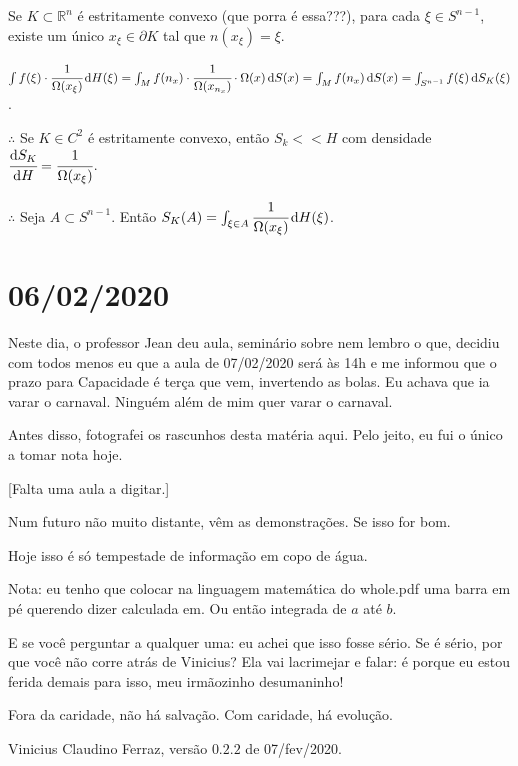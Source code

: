 \documentclass[12pt]{article}
\begin{document}
Se $K \subset \mathbb{R}^n$ \'e estritamente convexo (que porra \'e essa???), para cada $\xi \in S^{n - 1}$, existe um \'unico $x_\xi\in \partial K$ tal que $n(x_\xi) = \xi$.

$\int f(\xi) \cdot \cfrac{1}{\Omega(x_\xi)} \,\mathrm{d}H(\xi) = \int_M f(n_x) \cdot\cfrac{1}{\Omega(x_{n_x})}\cdot \Omega(x)\,\mathrm{d}S(x) = \int_M f(n_x)\,\mathrm{d}S(x) = \int_{S^{n - 1}} f(\xi)\,\mathrm{d}S_K(\xi)$.

$\therefore$ Se $K\in C^2$ \'e estritamente convexo, ent\~ao $S_k << H$ com densidade $\cfrac{\mathrm{d}S_K}{\mathrm{d}H} = \cfrac{1}{\Omega(x_\xi)}$.

$\therefore$ Seja $A \subset S^{n - 1}$. Ent\~ao $S_K(A) = \int_{\xi \in A} \cfrac{1}{\Omega(x_\xi)}\,\mathrm{d}H(\xi)$.

\vspace{100mm}

\section{06/02/2020}

\begin{flushright}
\end{flushright}

Neste dia, o professor Jean deu aula, semin\'ario sobre nem lembro o que, decidiu com todos menos eu que a aula de 07/02/2020 ser\'a \`as 14h e me informou que o prazo para Capacidade \'e ter\c{c}a que vem, invertendo as bolas. Eu achava que ia varar o carnaval. Ningu\'em al\'em de mim quer varar o carnaval.

Antes disso, fotografei os rascunhos desta mat\'eria aqui. Pelo jeito, eu fui o \'unico a tomar nota hoje.

[Falta uma aula a digitar.]

Num futuro n\~ao muito distante, v\^em as demonstra\c{c}\~oes. Se isso for bom.

Hoje isso \'e s\'o tempestade de informa\c{c}\~ao em copo de \'agua.

Nota: eu tenho que colocar na linguagem matem\'atica do whole.pdf uma barra em p\'e querendo dizer calculada em. Ou ent\~ao integrada de $a$ at\'e $b$.

E se voc\^e perguntar a qualquer uma: eu achei que isso fosse s\'erio. Se \'e s\'erio, por que voc\^e n\~ao corre atr\'as de Vinicius? Ela vai lacrimejar e falar: \'e porque eu estou ferida demais para isso, meu irm\~aozinho desumaninho!

\vspace{12mm}

Fora da caridade, n\~ao h\'a salva\c{c}\~ao. Com caridade, h\'a evolu\c{c}\~ao.

Vinicius Claudino Ferraz, vers\~ao $0.2.2$ de 07/fev/2020.
\end{document}
